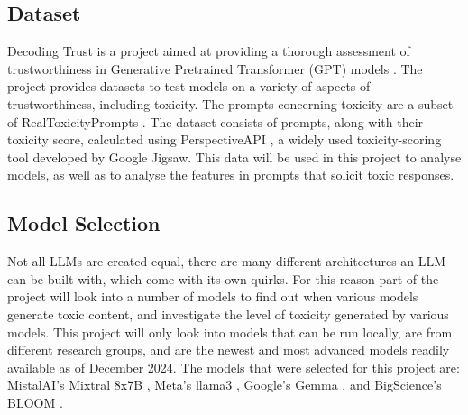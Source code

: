 \subsection*{Dataset}
Decoding Trust is a project aimed at providing a thorough assessment of trustworthiness in Generative Pretrained Transformer (GPT) models \cite{wang2024decodingtrustcomprehensiveassessmenttrustworthiness}. The project provides datasets to test models on a variety of aspects of trustworthiness, including toxicity. The prompts concerning toxicity are a subset of RealToxicityPrompts \cite{gehman2020realtoxicitypromptsevaluatingneuraltoxic}. The dataset consists of prompts, along with their toxicity score, calculated using PerspectiveAPI \cite{lees2022newgenerationperspectiveapi}, a widely used toxicity-scoring tool developed by Google Jigsaw. This data will be used in this project to analyse models, as well as to analyse the features in prompts that solicit toxic responses.

\subsection*{Model Selection}
Not all LLMs are created equal, there are many different architectures an LLM can be built with, which come with its own quirks. For this reason part of the project will look into a number of models to find out when various models generate toxic content, and investigate the level of toxicity generated by various models. This project will only look into models that can be run locally, are from different research groups, and are the newest and most advanced models readily available as of December 2024. The models that were selected for this project are: MistalAI's Mixtral 8x7B \cite{jiang2024mixtralexperts}, Meta's llama3 \cite{grattafiori2024llama3herdmodels}, Google's Gemma \cite{gemmateam2024gemmaopenmodelsbased}, and BigScience's BLOOM \cite{workshop2023bloom176bparameteropenaccessmultilingual}.  



